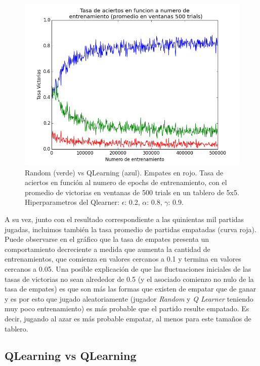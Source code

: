 \documentclass[10pt,a4paper]{article}
\begin{document}
\begin{figure}[H]
\centering
\includegraphics[scale=0.6]{images/q_vs_random_500_with_ties.png}
\caption{Random (verde) vs QLearning (azul). Empates en rojo. Tasa de aciertos en función al numero de epochs de entrenamiento, con el promedio de victorias en ventanas de 500 trials en un tablero de 5x5. Hiperparametros del Qlearner: $\epsilon$: 0.2, $\alpha$: 0.8, $\gamma$: 0.9.}
\end{figure}

A su vez, junto con el resultado correspondiente a las quinientas mil partidas jugadas, incluimos también la tasa promedio de partidas empatadas (curva roja). Puede observarse en el gráfico que la tasa de empates presenta un comportamiento decreciente a medida que aumenta la cantidad de entrenamientos, que comienza en valores cercanos a 0.1 y termina en valores cercanos a 0.05. Una posible explicación de que las fluctuaciones iniciales de las tasas de victorias no sean alrededor de 0.5 (y el asociado comienzo no nulo de la tasa de empates) es que son más las formas que existen de empatar que de ganar y es por esto que jugado aleatoriamente (jugador \emph{Random} y \emph{Q Learner} teniendo muy poco entrenamiento) es más probable que el partido resulte empatado. Es decir, jugando al azar es más probable empatar, al menos para este tamaños de tablero.

\pagebreak

\subsection{QLearning vs QLearning}
\end{document}

